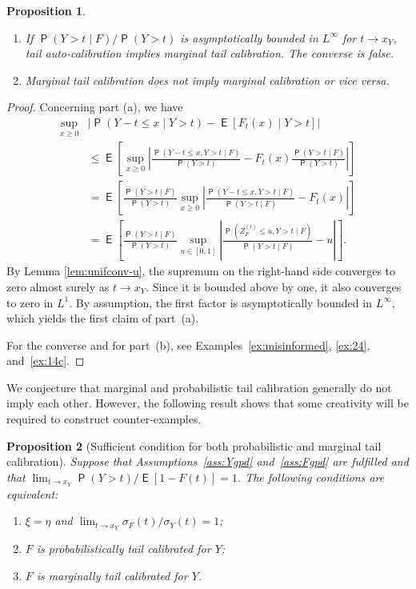 \documentclass[12pt]{article}
\newcommand{\E}{\operatorname{\mathsf{E}}}
\newcommand{\Q}{\operatorname{\mathsf{P}}}
\newcommand{\1}{\mathbf{1}} %
\newcommand{\ZFt}{Z_{F}^{(t)}} %
\newtheorem{propo}{Proposition}
\theoremstyle{definition}
\begin{document}
\begin{propo}
\begin{enumerate}[label=(\alph*)]
\item If $\Q(Y > t \mid F)/\Q(Y> t)$ is asymptotically bounded in $L^\infty$ for $t \to x_Y$, tail auto-calibration implies marginal tail calibration. The converse is false. 
\item Marginal tail calibration does not imply marginal calibration or vice versa.
\end{enumerate}
\end{propo}
\begin{proof}
Concerning part (a), we have
\begin{align*}
\sup_{x \ge 0} &\left| \Q(Y-t \le x \mid Y>t) - \E [F_t(x) \mid Y > t]\right| \\&\le \E \left[ \sup_{x \ge 0} \left| \frac{\Q(Y-t \le x, Y > t \mid F)}{\Q(Y > t)} -  F_t(x)\frac{\Q(Y > t \mid F)}{\Q(Y > t)}\right| \right]\\
&= \E \left[ \frac{\Q(Y > t \mid F)}{\Q(Y > t)}\sup_{x \ge 0} \left| \frac{\Q(Y-t \le x, Y > t \mid F)}{\Q(Y > t\mid F)} -  F_t(x)\right| \right]\\
    &= \E \left[ \frac{\Q(Y > t \mid F)}{\Q(Y > t)} \sup_{u \in [0,1]} \left| \frac{\Q(\ZFt \le u, Y > t \mid F)}{\Q(Y > t\mid F)} -  u 
    \right| \right].
\end{align*}
By Lemma \ref{lem:unifconv-u}, the supremum on the right-hand side converges to zero almost surely as $t \to x_Y$. Since it is bounded above by one, it also converges to zero in $L^1$. By assumption, the first factor is asymptotically bounded in $L^\infty$, which yields the first claim of part~(a).

For the converse and for part~(b), see Examples~\ref{ex:misinformed}, \ref{ex:24}, and~\ref{ex:14c}. 
\end{proof}


We conjecture that marginal and probabilistic tail calibration generally do not imply each other. However, the following result shows that some creativity will be required to construct counter-examples.

\begin{propo}[Sufficient condition for both probabilistic and marginal tail calibration]
\label{pro:suffptcmtc2}
	Suppose that Assumptions~\ref{ass:Ygpd} and~\ref{ass:Fgpd} are fulfilled and that $\lim_{t \to x_Y} \Q(Y > t) / \E[1 - F(t)] = 1$. The following conditions are equivalent:
	\begin{enumerate}[label=(\alph*)]
	\item $\xi = \eta$ and $\lim_{t \to x_Y} \sigma_F(t)/\sigma_Y(t) = 1$;
	\item $F$ is probabilistically tail calibrated for $Y$;
	\item $F$ is marginally tail calibrated for $Y$.
	\end{enumerate}
\end{propo}
\end{document}

